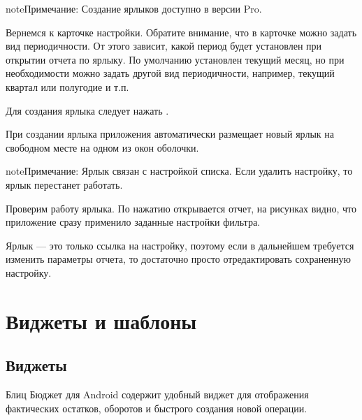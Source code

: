 \documentclass[a4paper,10pt,russian]{sphinxmanual}
\begin{document}
\begin{sphinxadmonition}{note}{Примечание:}
Создание ярлыков доступно в версии Pro.
\end{sphinxadmonition}

Вернемся к карточке настройки. Обратите внимание, что в карточке можно задать вид периодичности. От этого зависит,
какой период будет установлен при открытии отчета по ярлыку. По умолчанию установлен текущий месяц, но при
необходимости можно задать другой вид периодичности, например, текущий квартал или полугодие и т.п.

Для создания ярлыка следует нажать .

\noindent{}

\noindent{}

При создании ярлыка приложения автоматически размещает новый ярлык на свободном месте на одном из окон оболочки.

\begin{sphinxadmonition}{note}{Примечание:}
Ярлык связан с настройкой списка. Если удалить настройку, то ярлык перестанет работать.
\end{sphinxadmonition}

\noindent{}

\noindent{}

\noindent{}

Проверим работу ярлыка. По нажатию открывается отчет, на рисунках видно, что приложение сразу применило заданные
настройки фильтра.

Ярлык — это только ссылка на настройку, поэтому если в дальнейшем требуется изменить параметры отчета,
то достаточно просто отредактировать сохраненную настройку.


\chapter{Виджеты и шаблоны}
\label{\detokenize{widgets:chapter-widgets}}\label{\detokenize{widgets:id1}}\label{\detokenize{widgets::doc}}

\section{Виджеты}
\label{\detokenize{widgets:id2}}
Блиц Бюджет для Android содержит удобный виджет для отображения фактических остатков, оборотов и быстрого создания новой операции.
\end{document}
